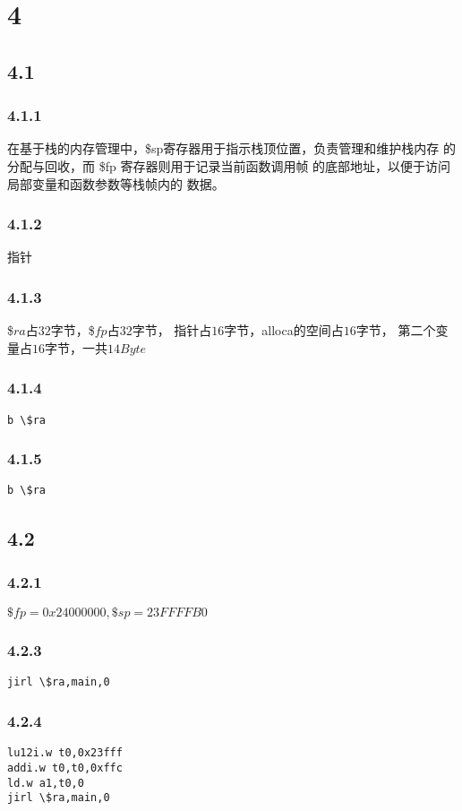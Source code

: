 \documentclass[12pt,a4paper]{ctexart}
\begin{document}
\section*{4}
\subsection*{4.1}
\subsubsection*{4.1.1}
在基于栈的内存管理中，\$sp寄存器用于指示栈顶位置，负责管理和维护栈内存
的分配与回收，而 \$fp
寄存器则用于记录当前函数调用帧
的底部地址，以便于访问局部变量和函数参数等栈帧内的
数据。
\subsubsection*{4.1.2}
指针
\subsubsection*{4.1.3}
\$$ra$占$32$字节，\$$fp$占$32$字节，
指针占$16$字节，alloca的空间占$16$字节，
第二个变量占$16$字节，一共$14Byte$
\subsubsection*{4.1.4}
\begin{lstlisting}
b \$ra    
\end{lstlisting}
\subsubsection*{4.1.5}
\begin{lstlisting}
b \$ra    
\end{lstlisting}
\subsection*{4.2}
\subsubsection*{4.2.1}
$\$fp=0x24000000,\$sp=23FFFFB0$
\subsubsection*{4.2.3}
\begin{lstlisting}
jirl \$ra,main,0    
\end{lstlisting}
\subsubsection*{4.2.4}
\begin{lstlisting}
lu12i.w t0,0x23fff
addi.w t0,t0,0xffc
ld.w a1,t0,0
jirl \$ra,main,0    
\end{lstlisting}
\end{document}
